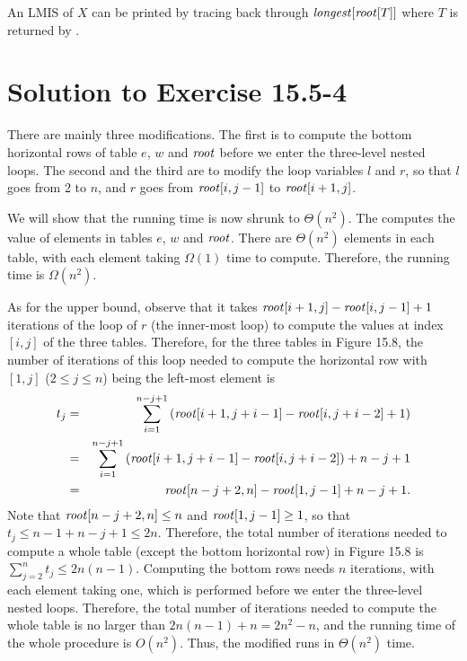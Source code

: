 \documentclass[a4paper, fleqn]{article}
\begin{document}
An LMIS of $X$ can be printed by tracing back through
$\id{longest}[\id{root}[T]]$ where $T$ is returned by .






\section*{Solution to Exercise 15.5-4}

There are mainly three modifications. The first is to compute the
bottom horizontal rows of table $e$, $w$ and $\id{root}$ before we
enter the three-level nested  loops. The second and the third
are to modify the  loop variables $l$ and $r$, so that $l$
goes from 2 to $n$, and $r$ goes from $\id{root}[i,j-1]$ to
$\id{root}[i+1,j]$.

We will show that the running time is now shrunk to $\Theta(n^2)$. The
 computes the value of elements in tables $e$, $w$
and $\id{root}$. There are $\Theta(n^2)$ elements in each table, with
each element taking $\Omega(1)$ time to compute. Therefore, the
running time is $\Omega(n^2)$.

As for the upper bound, observe that it takes $\id{root}[i+1,j] -
\id{root}[i,j-1] + 1$ iterations of the  loop of $r$ (the
inner-most  loop) to compute the values at index $[i,j]$ of
the three tables. Therefore, for the three tables in Figure 15.8, the
number of iterations of this  loop needed to compute the
horizontal row with $[1,j]$ ($2 \leq j \leq n$) being the left-most
element is
\begin{eqnarray*}
t_j
& = & \sum_{i=1}^{n-j+1}
      \left(\id{root}[i+1, j+i-1] - \id{root}[i, j+i-2] + 1\right) \\
& = & \sum_{i=1}^{n-j+1}
      \left(\id{root}[i+1, j+i-1] - \id{root}[i, j+i-2]\right)
      + n - j + 1 \\
& = & \id{root}[n-j+2, n] - \id{root}[1,j-1] + n - j + 1.
\end{eqnarray*}
Note that $\id{root}[n-j+2, n] \leq n$ and $\id{root}[1,j-1] \geq 1$,
so that $t_j \leq n - 1 + n - j + 1 \leq 2n$. Therefore, the total
number of iterations needed to compute a whole table (except the
bottom horizontal row) in Figure 15.8 is $\sum_{j=2}^n t_j \leq
2n(n-1)$.  Computing the bottom rows needs $n$ iterations, with each
element taking one, which is performed before we enter the three-level
nested  loops.  Therefore, the total number of iterations
needed to compute the whole table is no larger than $2n(n-1) + n =
2n^2 - n$, and the running time of the whole procedure is $O(n^2)$.
Thus, the modified  runs in $\Theta(n^2)$ time.
\end{document}
